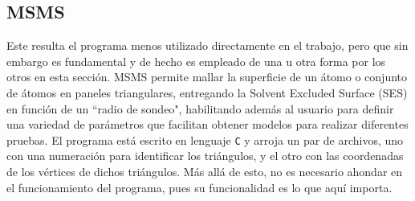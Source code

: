 \documentclass[12pt, twoside, onehalfspace, numbers, spanish]{ezthesis}
\numberwithin{equation}{section}
\begin{document}
\subsection{MSMS}\label{subsec:MSMS}
Este resulta el programa menos utilizado directamente en el trabajo, pero que sin embargo es fundamental y de hecho es empleado de una u otra forma por los otros en esta sección. MSMS permite mallar la superficie de un átomo o conjunto de átomos en paneles triangulares, entregando la Solvent Excluded Surface (SES) en función de un ``radio de sondeo", habilitando además al usuario para definir una variedad de parámetros que facilitan obtener modelos para realizar diferentes pruebas. El programa está escrito en lenguaje \texttt{C} y arroja un par de archivos, uno con una numeración para identificar los triángulos, y el otro con las coordenadas de los vértices de dichos triángulos. Más allá de esto, no es necesario ahondar en el funcionamiento del programa, pues su funcionalidad es lo que aquí importa.
\end{document}
